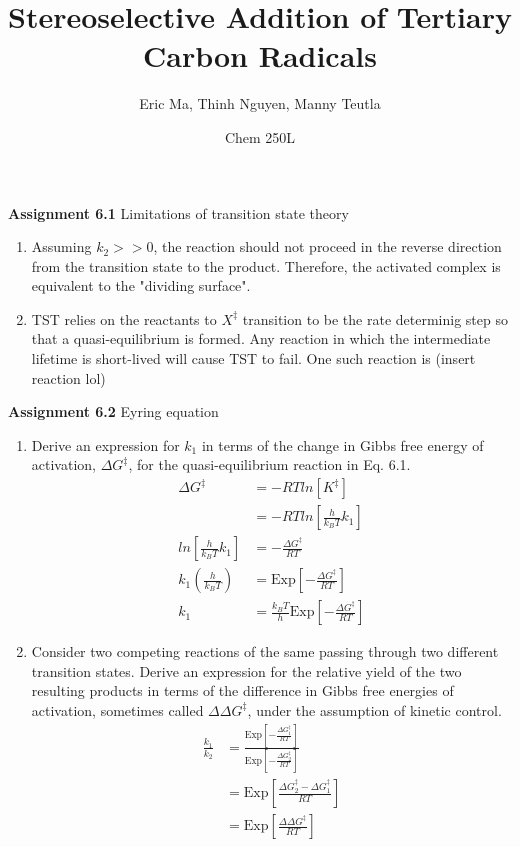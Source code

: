 \documentclass{article}
\title{Stereoselective Addition of Tertiary Carbon Radicals}
\author{Eric Ma, Thinh Nguyen, Manny Teutla}
\date{Chem 250L}
\begin{document}
\maketitle

\textbf{Assignment 6.1}
Limitations of transition state theory
\begin{enumerate}
	\item Assuming $k_2 >> 0$, the reaction should not proceed in the reverse direction from the transition state to the product.
	Therefore, the activated complex is equivalent to the "dividing surface".

	\item TST relies on the reactants to $X^\ddag$ transition to be the rate determinig step so that a quasi-equilibrium is formed.
	Any reaction in which the intermediate lifetime is short-lived will cause TST to fail.
	One such reaction is (insert reaction lol)
\end{enumerate}

\textbf{Assignment 6.2}
Eyring equation

\begin{enumerate}
	\item Derive an expression for $k_1$ in terms of the change in Gibbs free energy of activation, $\Delta G^\ddag$, for the quasi-equilibrium reaction in Eq. 6.1.
	\begin{equation*}
	\begin{split}
		\Delta G^\ddag & = - R T ln[ K^\ddag ] \\ 
		& = - R T ln[ \frac{h}{k_B T} k_1 ] \\
		ln[ \frac{h}{k_B T} k_1 ] & = - \frac{\Delta G^\ddag}{R T} \\
		k_1 ( \frac{h}{k_B T} ) & = \text{Exp}[ - \frac{\Delta G^\ddag}{R T} ] \\
		k_1 & = \frac{k_B T}{h} \text{Exp}[ - \frac{\Delta G^\ddag}{R T} ] 
	\end{split}
	\end{equation*}

	\item Consider two competing reactions of the same passing through two different transition states.
	Derive an expression for the relative yield of the two resulting products in terms of the difference in Gibbs free energies of activation, sometimes called $\Delta \Delta G^\ddag$, under the assumption of kinetic control.
	\begin{equation*}
	\begin{split}
		\frac{k_1}{k_2} & = \frac{\text{Exp}[ - \frac{\Delta G_1^\ddag}{R T} ]}{\text{Exp}[ - \frac{\Delta G_2^\ddag}{R T} ]} \\
		& = \text{Exp}[ \frac{\Delta G_2^\ddag - \Delta G_1^\ddag}{R T} ] \\
		& = \text{Exp}[ \frac{\Delta \Delta G^\ddag}{R T} ]  
	\end{split}
	\end{equation*}
\end{enumerate}
\end{document}
